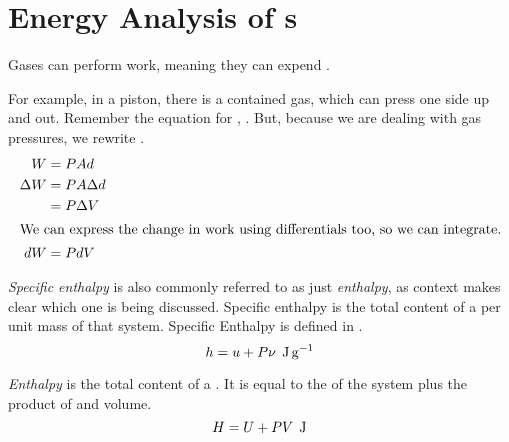 \section{Energy Analysis of s}\label{def:Energy_Analysis_Closed_Systems}
Gases can perform work, meaning they can expend .

For example, in a piston, there is a contained gas, which can press one side up and out.
Remember the equation for , .
But, because we are dealing with gas pressures, we rewrite .
\begin{align*}
  W &= P A d \\
  \Delta W &= P A \Delta d \\
        &= P \Delta V \\
  \intertext{We can express the change in work using differentials too, so we can integrate.}
  d W &= P dV
\end{align*}


\begin{definition}\label{def:Specific_Enthalpy}
  \emph{Specific enthalpy} is also commonly referred to as just \emph{enthalpy}, as context makes clear which one is being discussed.
  Specific enthalpy is the total  content of a  per unit mass of that system.
  Specific Enthalpy is defined in .
  \begin{equation}\label{eq:Specific_Enthalpy}
    h = u + P \nu \:\: \si{\joule\per\gram}
  \end{equation}
\end{definition}

\begin{definition}[Enthalpy]\label{def:Enthalpy}
  \emph{Enthalpy} is the total  content of a .
  It is equal to the  of the system plus the product of  and volume.
  \begin{equation}\label{eq:Enthalpy}
    H = U + P V \:\: \si{\joule}
  \end{equation}
\end{definition}

